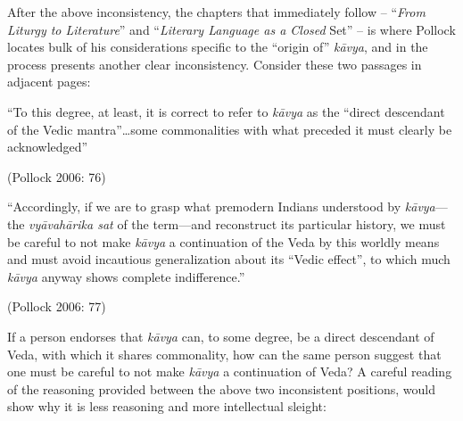 After the above inconsistency, the chapters that immediately follow – “\textit{From Liturgy to Literature}” and “\textit{Literary Language as a Closed} Set” – is where Pollock locates bulk of his considerations specific to the “origin of” \textit{kāvya}, and in the process presents another clear inconsistency. Consider these two passages in adjacent pages:

\begin{myquote}
“To this degree, at least, it is correct to refer to \textit{kāvya} as the “direct descendant of the Vedic mantra”…some commonalities with what preceded it must clearly be acknowledged”
\end{myquote}

\hfill (Pollock 2006: 76)

\begin{myquote}
“Accordingly, if we are to grasp what premodern Indians understood by \textit{kāvya}—the \textit{vyāvahārika sat} of the term—and reconstruct its particular history, we must be careful to not make \textit{kāvya} a continuation of the Veda by this worldly means and must avoid incautious generalization about its “Vedic effect”, to which much \textit{kāvya} anyway shows complete indifference.”
\end{myquote}

\hfill (Pollock 2006: 77)

If a person endorses that \textit{kāvya} can, to some degree, be a direct descendant of Veda, with which it shares commonality, how can the same person suggest that one must be careful to not make \textit{kāvya} a continuation of Veda? A careful reading of the reasoning provided between the above two inconsistent positions, would show why it is less reasoning and more intellectual sleight:

